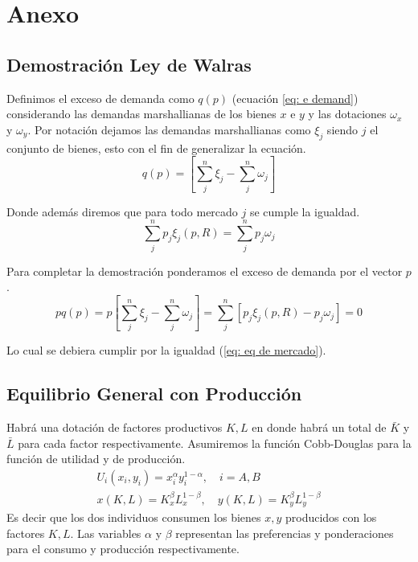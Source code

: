 \chapter{Anexo}

\section{Demostración Ley de Walras}

Definimos el exceso de demanda como $\textit{q}(p)$ (ecuación \ref{eq: e demand}) considerando las demandas marshallianas de los bienes $x$ e $y$ y las dotaciones $\omega_x$ y $\omega_y$. Por notación dejamos las demandas marshallianas como $\xi_j$ siendo $j$ el conjunto de bienes, esto con el fin de generalizar la ecuación. 
\begin{equation}
     \textit{q}(p) =  \left[  \sum ^n _{j} \xi_j - \sum ^n _{j} \omega_j \right] \label{eq: e demand}
\end{equation}

Donde además diremos que para todo mercado $j$ se cumple la igualdad.
\begin{equation}
    \sum ^n _{j} p_j \xi _j(p,R) = \sum ^n _{j} p_j \omega_j \label{eq: eq de mercado}
\end{equation}

Para completar la demostración ponderamos el exceso de demanda por el vector $p$.
\begin{equation}
    p\textit{q}(p) = p \left[  \sum ^n _{j} \xi_j - \sum ^n _{j} \omega_j \right] = \sum ^n _{j} \left[ p_j \xi_j(p,R) - p_j \omega_j    \right] = 0
\end{equation}

Lo cual se debiera cumplir por la igualdad (\ref{eq: eq de mercado}). 


\section{Equilibrio General con Producción}
Habrá una dotación de factores productivos $K,L$ en donde habrá un total de $\bar{K}$ y $\bar{L}$ para cada factor respectivamente. Asumiremos la función Cobb-Douglas para la función de utilidad y de producción.  
\begin{align*}
    U_i (x_i,y_i) = x_i^\alpha y_i ^{1-\alpha},  \quad i = A,B \\
    x(K,L) = K_x^\beta L_x ^{1-\beta}, \quad y(K,L) = K_y^\beta L_y^{1-\beta}  
\end{align*}
Es decir que los dos individuos consumen los bienes $x,y$ producidos con los factores $K,L$. Las variables $\alpha$ y $\beta$ representan las preferencias y ponderaciones para el consumo y producción respectivamente. 

